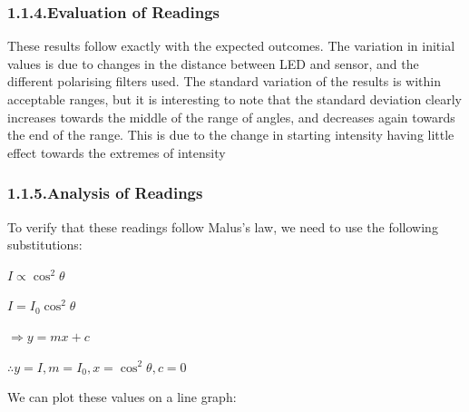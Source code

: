 \documentclass{article}
\begin{document}
\subsubsection{1.1.4.\hspace*{0.5em}Evaluation of Readings}\label{sec-evaluation-of-readings}%

\noindent{}These results follow exactly with the expected outcomes. The variation in initial values is due to changes in the distance between LED and sensor, and the different polarising filters used. The standard variation of the results is within acceptable ranges, but it is interesting to note that the standard deviation clearly increases towards the middle of the range of angles, and decreases again towards the end of the range. This is due to the change in starting intensity having little effect towards the extremes of intensity%

\subsubsection{1.1.5.\hspace*{0.5em}Analysis of Readings}\label{sec-analysis-of-readings}%

\noindent{}To verify that these readings follow Malus's law, we need to use the following substitutions:%

$I\propto\cos^2\theta$%

$I=I_0\cos^2\theta$%

$\Rightarrow y=mx+c$%

$\therefore y=I, m=I_0, x=\cos^2\theta, c=0$%

We can plot these values on a line graph:%
\end{document}
